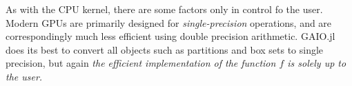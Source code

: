 As with the CPU kernel, there are some factors only in control fo the user. Modern GPUs 
are primarily designed for \emph{single-precision} operations, and are correspondingly 
much less efficient using double precision arithmetic. GAIO.jl does its best to convert 
all objects such as partitions and box sets to single precision, but again \emph{
the efficient implementation of the function $f$ is solely up to the user.
}

